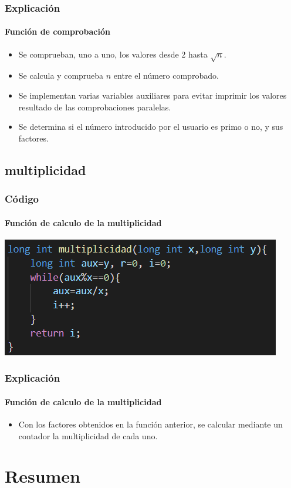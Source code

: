 \documentclass{beamer}
\begin{document}
\begin{frame}
  \frametitle{Explicaci\'on}
  \framesubtitle{Funci\'on de comprobaci\'on}
  \begin{itemize}[<+->] %
  \item Se comprueban, uno a uno, los valores desde 2 hasta $\sqrt{n}$.
  \item Se calcula y comprueba $n$ entre el n\'umero comprobado.
  \item Se implementan varias variables auxiliares para evitar imprimir los valores resultado de las comprobaciones paralelas.
  \item Se determina si el n\'umero introducido por el usuario es primo o no, y sus factores.
  \end{itemize}
\end{frame}

\subsection[multiplicidad]{multiplicidad}

\begin{frame}
  \frametitle{C\'odigo}
  \framesubtitle{Funci\'on de calculo de la multiplicidad}
  \begin{center}
 \includegraphics[scale=1]{multiplicidad}
\end{center}
\end{frame}

\begin{frame}
  \frametitle{Explicaci\'on}
  \framesubtitle{Funci\'on de calculo de la multiplicidad}
  \begin{itemize}[<+->] %
  \item Con los factores obtenidos en la funci\'on anterior, se calcular mediante un contador la multiplicidad de cada uno.
  \end{itemize}
\end{frame}

\section*{Resumen}
\end{document}
